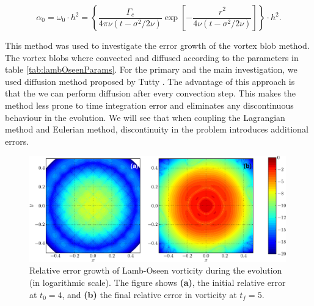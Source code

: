 	\begin{equation}
	\alpha_0 = \omega_0\cdot h^2 = \left\{ \frac{\Gamma_c}{4\pi\nu\left(t-\sigma^2/2\nu\right)} \exp\left[-\frac{r^2}{4\nu\left(t-\sigma^2/2\nu\right)}\right] \right\} \cdot h^2.
	\label{eq:lo_pie}
	\end{equation}
	
This method was used to investigate the error growth of the vortex blob method. The vortex blobs where convected and diffused according to the parameters in table \ref{tab:lambOseenParams}. For the primary and the main investigation, we used diffusion method proposed by Tutty \cite{Tutty2010a}. The advantage of this approach is that the we can perform diffusion after every convection step. This makes the method less prone to time integration error and eliminates any discontinuous behaviour in the evolution. We will see that when coupling the Lagrangian method and Eulerian method, discontinuity in the problem introduces additional errors.

	\begin{figure}[p]
	\centering
	\includegraphics[width=0.99\textwidth]{figures/lagrangian/lambOseen_convection_vorticityErrorContours_compressed-crop.pdf}
	\caption{Relative error growth of Lamb-Oseen vorticity during the evolution (in logarithmic scale). The figure shows \textbf{(a)}, the initial relative error at $t_0=4$, and \textbf{(b)} the final relative error in vorticity at $t_f=5$.}
	\label{fig:lambOseen_convection_vorticityErrorContours_compressed}
	\end{figure}

